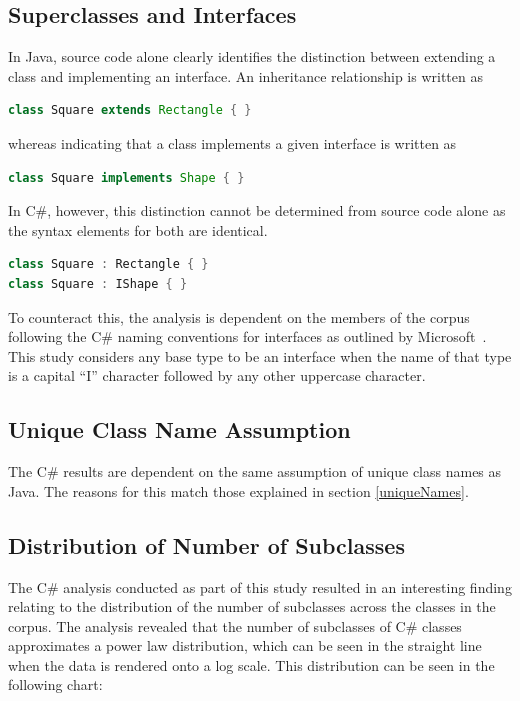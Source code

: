 \subsection{Superclasses and Interfaces}
\label{interfaceNaming}
In Java, source code alone clearly identifies the distinction between extending a class and implementing an interface. An inheritance relationship is written as
\begin{lstlisting}[language=java]
class Square extends Rectangle { }
\end{lstlisting}
whereas indicating that a class implements a given interface is written as
\begin{lstlisting}[language=java]
class Square implements Shape { }
\end{lstlisting}
In C\#, however, this distinction cannot be determined from source code alone as the syntax elements for both are identical.
\begin{lstlisting}[language=cs]
class Square : Rectangle { }
class Square : IShape { }
\end{lstlisting}
To counteract this, the analysis is dependent on the members of the corpus following the C\# naming conventions for interfaces as outlined by Microsoft~\cite{InterfaceNaming}. This study considers any base type to be an interface when the name of that type is a capital ``I'' character followed by any other uppercase character.

\subsection{Unique Class Name Assumption}
The C\# results are dependent on the same assumption of unique class names as Java. The reasons for this match those explained in section \ref{uniqueNames}.

\subsection{Distribution of Number of Subclasses}
The C\# analysis conducted as part of this study resulted in an interesting finding relating to the distribution of the number of subclasses across the classes in the corpus. The analysis revealed that the number of subclasses of C\# classes approximates a power law distribution, which can be seen in the straight line when the data is rendered onto a log scale. This distribution can be seen in the following chart:



